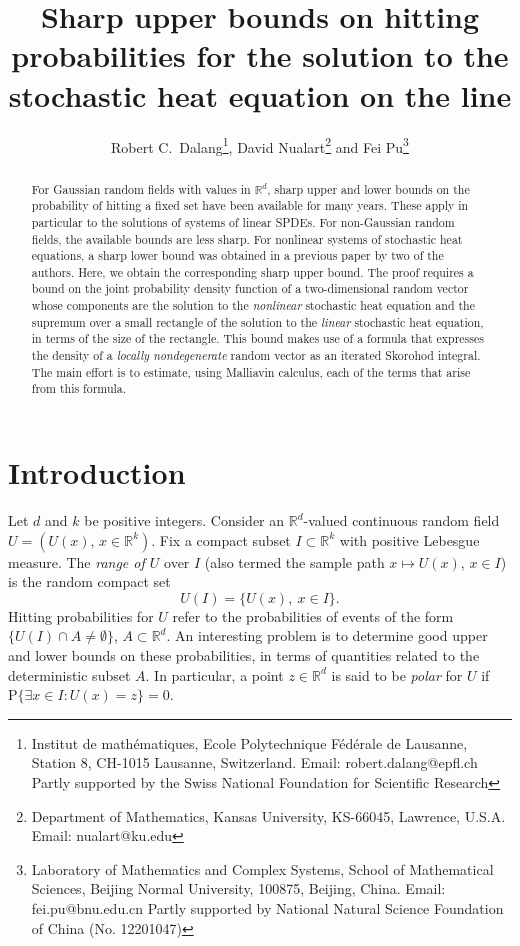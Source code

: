 \documentclass[12pt,a4paper]{article}
\title{Sharp upper bounds on hitting probabilities for the solution to the stochastic heat equation on the line}
\author{Robert C.~Dalang\footnote{Institut de math\'ematiques,
Ecole Polytechnique F\'ed\'erale de Lausanne, Station 8,
CH-1015 Lausanne, Switzerland.
Email: robert.dalang@epfl.ch Partly supported by the Swiss National Foundation for Scientific Research}, David Nualart\footnote{Department of Mathematics, Kansas University, KS-66045, Lawrence, U.S.A. 
Email: nualart@ku.edu} 
and Fei Pu\footnote{Laboratory of Mathematics and Complex Systems,
School of Mathematical Sciences, Beijing Normal University, 100875, Beijing, China. Email: fei.pu@bnu.edu.cn Partly supported by National Natural Science Foundation of China (No. 12201047)}
}
\date{}                                           %
\newcommand{\R}{{\mathbb{R}}}
\renewcommand{\P}{\mathrm{P}}
\newcommand{\<}{\langle}
\renewcommand{\>}{\rangle}
\begin{document}
\newtheorem{stat}{Statement}[section]
\newtheorem{proposition}[stat]{Proposition}
\newtheorem*{prop}{Proposition}
\newtheorem{corollary}[stat]{Corollary}
\newtheorem{theorem}[stat]{Theorem}
\newtheorem{lemma}[stat]{Lemma}
\theoremstyle{definition}
\newtheorem{definition}[stat]{Definition}
\newtheorem*{cremark}{Remark}
\newtheorem{remark}[stat]{Remark}
\newtheorem*{OP}{Open Problem}
\newtheorem{example}[stat]{Example}
\newtheorem{nota}[stat]{Notation}
\maketitle

\begin{abstract}
    For Gaussian random fields with values in $\R^d$, sharp upper and lower bounds on the probability of hitting a fixed set have been available for many years. These apply in particular to the solutions of systems of linear SPDEs. For non-Gaussian random fields, the available bounds are less sharp. For nonlinear systems of stochastic heat equations, a sharp lower bound was obtained in a previous paper by two of the authors. Here, we obtain the corresponding sharp upper bound. The proof requires a bound on the joint probability density function of a two-dimensional random vector whose components are the solution to the {\em nonlinear} stochastic heat equation and the supremum over a small rectangle of the solution to the {\em linear} stochastic heat equation, in terms of  the size of the rectangle. This bound makes use of a formula that expresses the density of a {\em locally nondegenerate} random vector as an iterated Skorohod integral. The main effort is to estimate, using Malliavin calculus, each of the terms that arise from this formula.
 \end{abstract}


\section{Introduction}
 Let $d$ and $k$ be positive integers. Consider an $\R^{d}$-valued continuous random field $U=(U(x),\, x \in \R^{k})$. Fix a compact subset $I \subset \R^k$ with positive Lebesgue measure.  The {\em range of $U$} over $I$ (also termed the sample path $x \mapsto U(x)$, $x \in I$) is the random compact set
$$
   U(I) = \{U(x),\ x \in I\}.
$$
Hitting probabilities for $U$ refer to the probabilities of events of the form $\{U(I) \cap A \neq \emptyset\}$, $A \subset \R^d$. An interesting problem is to determine good upper and lower bounds on these probabilities, in terms of quantities related to the deterministic subset $A$. In particular, a point $z \in \R^d$ is said to be {\em polar} for $U$ if $\P\{\exists x \in I: U(x) = z\} = 0$.
\end{document}
